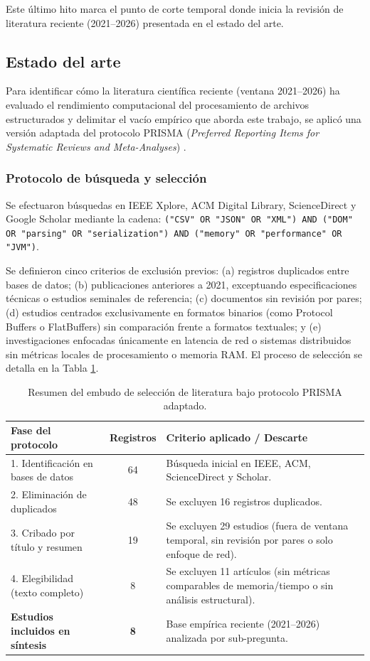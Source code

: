 Este último hito marca el punto de corte temporal donde inicia la revisión de literatura reciente (2021--2026) presentada en el estado del arte.

\subsection{Estado del arte}

Para identificar cómo la literatura científica reciente (ventana 2021--2026) ha evaluado el rendimiento computacional del procesamiento de archivos estructurados y delimitar el vacío empírico que aborda este trabajo, se aplicó una versión adaptada del protocolo PRISMA (\textit{Preferred Reporting Items for Systematic Reviews and Meta-Analyses}) \cite{page2021}.

\subsubsection{Protocolo de búsqueda y selección}

Se efectuaron búsquedas en IEEE Xplore, ACM Digital Library, ScienceDirect y Google Scholar mediante la cadena: \texttt{("CSV" OR "JSON" OR "XML") AND ("DOM" OR "parsing" OR "serialization") AND ("memory" OR "performance" OR "JVM")}.

Se definieron cinco criterios de exclusión previos: (a) registros duplicados entre bases de datos; (b) publicaciones anteriores a 2021, exceptuando especificaciones técnicas o estudios seminales de referencia; (c) documentos sin revisión por pares; (d) estudios centrados exclusivamente en formatos binarios (como Protocol Buffers o FlatBuffers) sin comparación frente a formatos textuales; y (e) investigaciones enfocadas únicamente en latencia de red o sistemas distribuidos sin métricas locales de procesamiento o memoria RAM. El proceso de selección se detalla en la Tabla \ref{tab:prisma}.

\begin{table}[htbp]
\centering
\caption{Resumen del embudo de selección de literatura bajo protocolo PRISMA adaptado.}
\label{tab:prisma}
\begin{tabularx}{\textwidth}{p{5.5cm} c X}
\toprule
\textbf{Fase del protocolo} & \textbf{Registros} & \textbf{Criterio aplicado / Descarte} \\
\midrule
1. Identificación en bases de datos & 64 & Búsqueda inicial en IEEE, ACM, ScienceDirect y Scholar. \\
2. Eliminación de duplicados & 48 & Se excluyen 16 registros duplicados. \\
3. Cribado por título y resumen & 19 & Se excluyen 29 estudios (fuera de ventana temporal, sin revisión por pares o solo enfoque de red). \\
4. Elegibilidad (texto completo) & 8 & Se excluyen 11 artículos (sin métricas comparables de memoria/tiempo o sin análisis estructural). \\
\midrule
\textbf{Estudios incluidos en síntesis} & \textbf{8} & Base empírica reciente (2021--2026) analizada por sub-pregunta. \\
\bottomrule
\end{tabularx}
\end{table}

